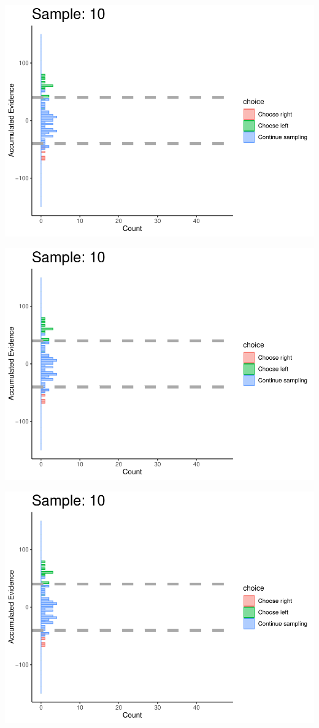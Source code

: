 \documentclass[
]{book}
\begin{document}
\begin{center}\includegraphics[width=0.8\linewidth]{LateNightBayes_files/figure-latex/collapsing_check-92} \end{center}

\begin{center}\includegraphics[width=0.8\linewidth]{LateNightBayes_files/figure-latex/collapsing_check-93} \end{center}

\begin{center}\includegraphics[width=0.8\linewidth]{LateNightBayes_files/figure-latex/collapsing_check-94} \end{center}
\end{document}
